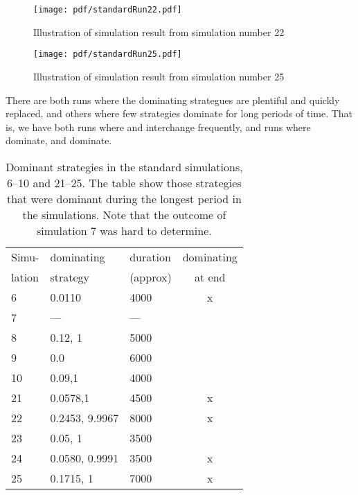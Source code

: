 \begin{figure}[htbp]
\centering
\texttt{[image: pdf/standardRun22.pdf]}
\caption{Illustration of simulation result from simulation number 22}
\label{fig:results:example:2}
\end{figure}

\begin{figure}[htbp]
\centering
\texttt{[image: pdf/standardRun25.pdf]}
\caption{Illustration of simulation result from simulation number 25}
\label{fig:results:example:3}
\end{figure}

There are both runs where the dominating strategues are plentiful and quickly replaced, and others where few strategies dominate for long periods of time. That is, we have both runs where  and  interchange frequently, and runs where  dominate, and  dominate.


\begin{table}[!hbtp]
  \centering
  \caption{Dominant strategies in the standard simulations, 6--10 and
    21--25. The table show those strategies that were dominant during
    the longest period in the simulations. Note that the outcome of
    simulation 7 was hard to determine.}
  \label{tab:results:dominant:6}
  \footnotesize
  \begin{tabular}{lllc}
    Simu-  & dominating & duration  & dominating \\
    lation & strategy   & (approx)  & at end \\
    \hline
    6  & 0.0110         & 4000 & x \\          
    7  & ---            & --- &            \\
    8  & 0.12, 1        & 5000 &            \\ 
    9  & 0.0            & 6000 &            \\ 
    10 & 0.09,1         & 4000 &            \\ 
    21 & 0.0578,1       & 4500 & x \\          
    22 & 0.2453, 9.9967 & 8000 & x \\          
    23 & 0.05, 1        & 3500 &            \\ 
    24 & 0.0580, 0.9991 & 3500 & x \\          
    25 & 0.1715, 1      & 7000 & x \\          
    \hline
  \end{tabular}
\end{table}

